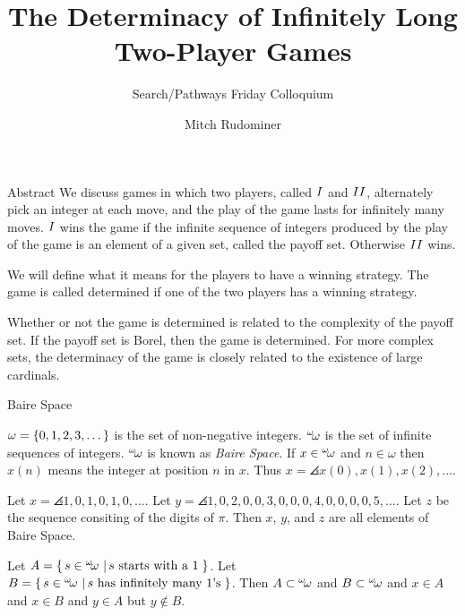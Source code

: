 \documentclass[pdf,final]{prosper}
\title{The Determinacy of Infinitely Long Two-Player Games}
\subtitle{Search/Pathways Friday Colloquium}
\author{Mitch Rudominer}
\newcommand{\skipsmall}{\vspace{1em}}
\begin{document}
\maketitle

\begin{slide}{Abstract}
We discuss games in which two players, 
called $I$ and  $II$, alternately pick an integer at each move, and the
play of the game lasts for infinitely many moves. 
$I$ wins the game if the infinite sequence of integers produced by the play of the game is an element of a given set, 
called the payoff set. Otherwise $II$ wins. 

\skipsmall

We will define what it means for the players to have a winning strategy. 
The game is called determined if one of the two players has a winning strategy. 

\skipsmall

Whether or not the game is determined is related to the complexity of the payoff set. 
If the payoff set is Borel, then the game is determined. For more complex sets, the determinacy of the game is closely related to the 
existence of large cardinals.
\end{slide}

\begin{slide}{Baire Space}
\begin{definition}
$\omega=\left\{0,1,2,3,\dots\right\}$ is the set of non-negative integers.
\newline
${}^{\omega}\!{\omega}$ is the set of infinite sequences of integers.
\newline
${}^{\omega}\!{\omega}$ is known as \emph{Baire Space}.
\newline
If $x\in{}^{\omega}\!{\omega}$ and $n\in\omega$ then $x(n)$ means the integer at position
$n$ in $x$. Thus $x=\angles{x(0),x(1),x(2),\dots}$.
\end{definition}

\skipsmall

\begin{example}
Let $x=\angles{1,0,1,0,1,0,\dots}$.
\newline
Let $y=\angles{1,0,2,0,0,3,0,0,0,4,0,0,0,0,5,\dots}$.
\newline
Let $z$ be the sequence consiting of the digits of $\pi$.
\newline
Then $x$, $y$, and $z$ are all elements of Baire Space.
\end{example}

\skipsmall

\begin{example}
Let $A=\left\{ \, s\in{}^{\omega}\!{\omega} \, \left| \, s\text{ starts with a 1} \, \right.\right\}$.
\newline
Let $B=\left\{ \, s\in{}^{\omega}\!{\omega} \, \left| \, s\text{ has infinitely many 1's} \, \right.\right\}$.
\newline
Then $A\subset{}^{\omega}\!{\omega}$ and $B\subset{}^{\omega}\!{\omega}$ and $x\in A$ and $x\in B$
and $y\in A$ but $y\notin B$.
\end{example}


\end{slide}
\end{document}
